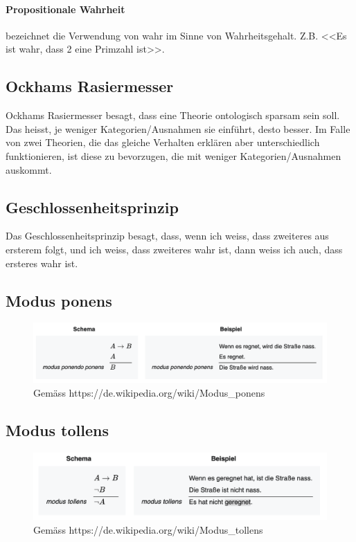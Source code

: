 \documentclass[../main.tex]{subfiles}
\begin{document}
\paragraph{Propositionale Wahrheit} bezeichnet die Verwendung von wahr im Sinne von Wahrheitsgehalt. Z.B. <<Es ist wahr, dass 2 eine Primzahl ist>>. 

\subsection{Ockhams Rasiermesser}
Ockhams Rasiermesser besagt, dass eine Theorie ontologisch sparsam sein soll. Das heisst, je weniger Kategorien/Ausnahmen sie einführt, desto besser. Im Falle von zwei Theorien, die das gleiche Verhalten erklären aber unterschiedlich funktionieren, ist diese zu bevorzugen, die mit weniger Kategorien/Ausnahmen auskommt. 

\subsection{Geschlossenheitsprinzip}
Das Geschlossenheitsprinzip besagt, dass, wenn ich weiss, dass zweiteres aus ersterem folgt, und ich weiss, dass zweiteres wahr ist, dann weiss ich auch, dass ersteres wahr ist. 

\subsection{Modus ponens}
\begin{figure}[!htb]
\centering
\includegraphics[width=\textwidth]{images/modus_pollens.png}
\caption{Gemäss https://de.wikipedia.org/wiki/Modus\_ponens}
\end{figure}


\subsection{Modus tollens}
\begin{figure}[!htb]
\centering
\includegraphics[width=\textwidth]{images/modus_tollens.png}
\caption{Gemäss https://de.wikipedia.org/wiki/Modus\_tollens}
\end{figure}
\end{document}
